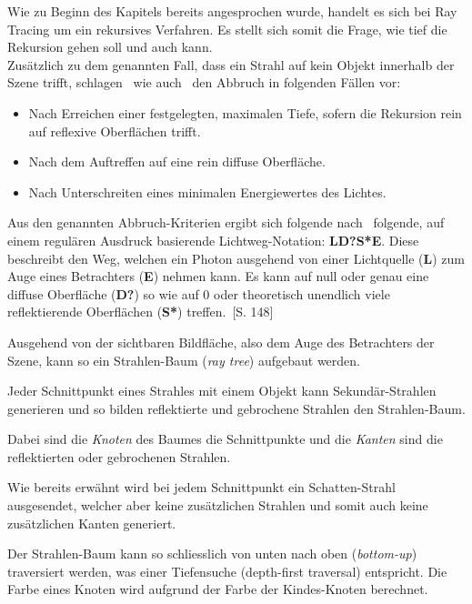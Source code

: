 Wie zu Beginn des Kapitels bereits angesprochen wurde, handelt es sich
bei Ray Tracing um ein rekursives Verfahren. Es stellt sich somit die
Frage, wie tief die Rekursion gehen soll und auch kann.\\
Zusätzlich zu dem genannten Fall, dass ein Strahl auf kein Objekt
innerhalb der Szene trifft, schlagen~\citeauthor{whitted_improved_1980}
wie auch~\citeauthor{glassner_introduction_1989} den Abbruch in
folgenden Fällen vor:
\begin{itemize}
        \item{Nach Erreichen einer festgelegten, maximalen Tiefe},
            sofern die Rekursion rein auf reflexive Oberflächen trifft.
        \item{Nach dem Auftreffen auf eine rein diffuse Oberfläche.}
        \item{Nach Unterschreiten eines minimalen Energiewertes des
                Lichtes.}
\end{itemize}

Aus den genannten Abbruch-Kriterien ergibt sich folgende
nach~\citeauthor{heckbert_adaptive_1990} folgende, auf einem regulären
Ausdruck basierende Lichtweg-Notation: \textbf{LD?S*E}. Diese beschreibt den
Weg, welchen ein Photon ausgehend von einer Lichtquelle (\textbf{L}) zum Auge eines
Betrachters (\textbf{E}) nehmen kann. Es kann auf null oder genau eine diffuse
Oberfläche (\textbf{D?}) so wie auf 0 oder theoretisch unendlich viele reflektierende
Oberflächen (\textbf{S*}) treffen.~\cite{heckbert_adaptive_1990}[S. 148]

Ausgehend von der sichtbaren Bildfläche, also dem Auge des Betrachters
der Szene, kann so ein Strahlen-Baum (\textit{ray tree}) aufgebaut
werden.

Jeder Schnittpunkt eines Strahles mit einem Objekt kann
Sekundär-Strahlen generieren und so bilden reflektierte und gebrochene
Strahlen den Strahlen-Baum.

Dabei sind die \textit{Knoten} des Baumes die Schnittpunkte und die
\textit{Kanten} sind die reflektierten oder gebrochenen Strahlen.

Wie bereits erwähnt wird bei jedem Schnittpunkt ein Schatten-Strahl
ausgesendet, welcher aber keine zusätzlichen Strahlen und somit auch
keine zusätzlichen Kanten generiert.

Der Strahlen-Baum kann so schliesslich von unten nach oben
(\textit{bottom-up}) traversiert werden, was einer Tiefensuche
(depth-first traversal) entspricht. Die Farbe eines Knoten wird aufgrund
der Farbe der Kindes-Knoten berechnet.

